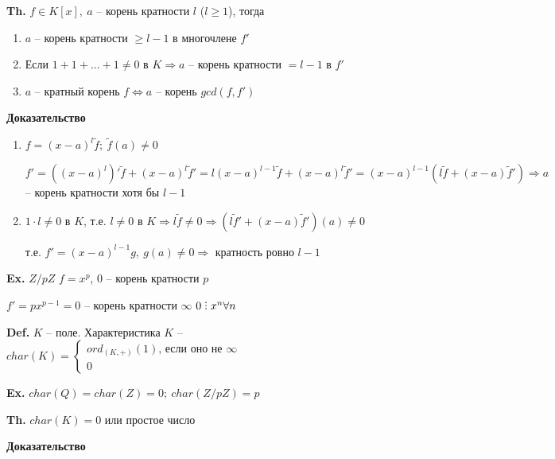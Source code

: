 \documentclass[14pt, letter paper]{article}
\def\divby{%
  \mathrel{\text{\vbox{\baselineskip.65ex\lineskiplimit0pt\hbox{.}\hbox{.}\hbox{.}}}}%
}
\begin{document}
\textbf{Th.} $f \in K[x],\ a$ -- корень кратности $l$ ($l \geq 1$), тогда

\begin{enumerate}
    \item $a$ -- корень кратности $\geq l -1$ в многочлене $f'$
    \item Если $1 + 1 + \ldots + 1 \neq 0$ в $K \Rightarrow a$ -- корень кратности $= l - 1$ в $f'$
    \item $a$ -- кратный корень $f \Leftrightarrow a$ -- корень $gcd(f, f')$
\end{enumerate}

\begin{center}
    \textbf{Доказательство}
\end{center}

\begin{enumerate}
    \item $f = (x - a)^l \tilde{f};\ \tilde{f}(a) \neq 0$

    $f' = ((x - a)^l)' \tilde{f} + (x - a)^l \tilde{f}' = l(x - a)^{l-1} \tilde{f} + (x - a)^l \tilde{f}' = (x - a)^{l-1}(l\tilde{f} + (x - a)\tilde{f}') \Rightarrow a$ -- корень кратности хотя бы $l - 1$

    \item $1 \cdot l \neq 0$ в $K$, т.е. $l \neq 0$ в $K \Rightarrow l\tilde{f} \neq 0 \Rightarrow (l\tilde{f}' + (x - a)\tilde{f}')(a) \neq 0$
    
    т.е. $f' = (x - a)^{l - 1} g,\ g(a) \neq 0 \Rightarrow$ кратность ровно $l - 1$
\end{enumerate}

\textbf{Ex.} $Z/pZ$ $f = x^p$, 0 -- корень кратности $p$

$f' = px^{p-1} = 0$ -- корень кратности $\infty$ $0 \divby x^n \forall n$

\vspace{5mm}

\textbf{Def.} $K$ -- поле. Характеристика $K$ -- $char(K) = \begin{cases}
    ord_{(K, +)}(1) \text{, если оно не } \infty \\
    0
\end{cases}$

\textbf{Ex.} $char(Q) = char(Z) = 0;\ char(Z/pZ) = p$

\textbf{Th.} $char(K) = 0$ или простое число

\begin{center}
    \textbf{Доказательство}
\end{center}
\end{document}
